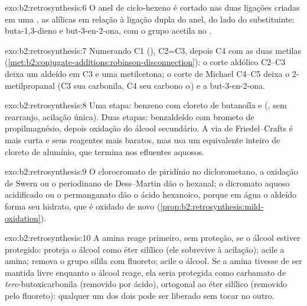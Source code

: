 \begin{solution}{exo:b2:retrosynthesis:6}
O anel de ciclo-hexeno é cortado nas duas ligações  criadas em uma ,
as alílicas em relação à ligação dupla do anel, do lado do substituinte: buta-1,3-dieno e
but-3-en-2-ona, com o grupo acetila no .
\end{solution}

\begin{solution}{exo:b2:retrosynthesis:7}
Numerando C1 (), C2=C3, depois C4 com as duas metilas
(\cref{met:b2:conjugate-additions:robinson-disconnection}): o corte aldólico C2--C3 deixa um aldeído
em C3 e uma metilcetona; o corte de Michael C4--C5 deixa o 2-metilpropanal (C3 sua carbonila, C4 seu
carbono $\alpha$) e a but-3-en-2-ona.
\end{solution}

\begin{solution}{exo:b2:retrosynthesis:8}
Uma etapa: benzeno com cloreto de butanoíla e  (, sem rearranjo,
acilação única). Duas etapas: benzaldeído com brometo de propilmagnésio, depois oxidação do álcool
secundário. A via de Friedel--Crafts é mais curta e seus reagentes mais baratos, mas usa um equivalente
inteiro de cloreto de alumínio, que termina nos efluentes aquosos.
\end{solution}

\begin{solution}{exo:b2:retrosynthesis:9}
O clorocromato de piridínio no diclorometano, a oxidação de Swern ou o periodinano de Dess--Martin
dão o hexanal; o dicromato aquoso acidificado ou o permanganato dão o ácido hexanoico, porque em água
o aldeído forma seu hidrato, que é oxidado de novo (\cref{prop:b2:retrosynthesis:mild-oxidation}).
\end{solution}

\begin{solution}{exo:b2:retrosynthesis:10}
A amina reage primeiro, sem proteção, se o álcool estiver protegido: proteja o álcool como éter
silílico (ele sobrevive à acilação); acile a amina; remova o grupo silila com fluoreto; acile o
álcool. Se a amina tivesse de ser mantida livre enquanto o álcool reage, ela seria protegida como
carbamato de \textit{terc}-butoxicarbonila (removido por ácido), ortogonal ao éter silílico (removido
pelo fluoreto): qualquer um dos dois pode ser liberado sem tocar no outro.
\end{solution}

